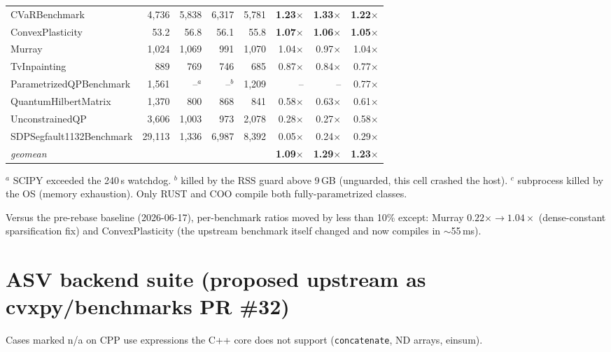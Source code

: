 \documentclass[11pt]{article}
\begin{document}
\begin{table}[h]
\begin{tabular}{lrrrrrrr}
CVaRBenchmark & 4,736 & 5,838 & 6,317 & 5,781 & \textbf{1.23$\times$} & \textbf{1.33$\times$} & \textbf{1.22$\times$} \\
ConvexPlasticity & 53.2 & 56.8 & 56.1 & 55.8 & \textbf{1.07$\times$} & \textbf{1.06$\times$} & \textbf{1.05$\times$} \\
Murray & 1,024 & 1,069 & 991 & 1,070 & 1.04$\times$ & 0.97$\times$ & 1.04$\times$ \\
TvInpainting & 889 & 769 & 746 & 685 & 0.87$\times$ & 0.84$\times$ & 0.77$\times$ \\
ParametrizedQPBenchmark & 1,561 & --$^{a}$ & --$^{b}$ & 1,209 & -- & -- & 0.77$\times$ \\
QuantumHilbertMatrix & 1,370 & 800 & 868 & 841 & 0.58$\times$ & 0.63$\times$ & 0.61$\times$ \\
UnconstrainedQP & 3,606 & 1,003 & 973 & 2,078 & 0.28$\times$ & 0.27$\times$ & 0.58$\times$ \\
SDPSegfault1132Benchmark & 29,113 & 1,336 & 6,987 & 8,392 & 0.05$\times$ & 0.24$\times$ & 0.29$\times$ \\
\midrule
\textit{geomean} & & & & & \textbf{1.09$\times$} & \textbf{1.29$\times$} & \textbf{1.23$\times$} \\
\bottomrule
\end{tabular}

\smallskip\footnotesize
$^a$ SCIPY exceeded the 240\,s watchdog. \quad
$^b$ killed by the RSS guard above 9\,GB (unguarded, this cell crashed the host). \quad
$^c$ subprocess killed by the OS (memory exhaustion). Only RUST and COO compile both
fully-parametrized classes.
\end{table}

Versus the pre-rebase baseline (2026-06-17), per-benchmark ratios moved by less than
10\% except: Murray $0.22\times \to 1.04\times$ (dense-constant sparsification fix) and
ConvexPlasticity (the upstream benchmark itself changed and now compiles in $\sim$55\,ms).

\section{ASV backend suite (proposed upstream as cvxpy/benchmarks PR \#32)}
Cases marked n/a on CPP use expressions the C++ core does not support
(\texttt{concatenate}, ND arrays, einsum).
\end{document}
